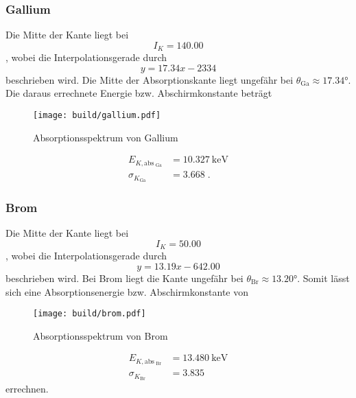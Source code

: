 \subsubsection{Gallium}
Die Mitte der Kante liegt bei 
\begin{equation*}
    I_K = 140.00
\end{equation*}
, wobei die Interpolationsgerade durch 
\begin{equation*}
    y = 17.34x -2334
\end{equation*}
beschrieben wird.
Die Mitte der Absorptionskante liegt ungefähr bei $\theta_\text{Ga} \approx \ang{17.34;;}$. Die daraus errechnete Energie bzw. Abschirmkonstante beträgt
\begin{figure}
    \centering
    \caption{Absorptionsspektrum von Gallium}
    \label{fig:Gallium}
    \texttt{[image: build/gallium.pdf]}
\end{figure}
\begin{align*}
    E_{K, \text{abs}_\text{ Ga}}  &= \SI{10.327}{\kilo\electronvolt} \\
    \sigma_{K_\text{Ga}}                &= \num{3.668} \; \text{.}
\end{align*}
\FloatBarrier
\subsubsection{Brom}
Die Mitte der Kante liegt bei 
\begin{equation*}
    I_K = 50.00
\end{equation*}
, wobei die Interpolationsgerade durch 
\begin{equation*}
    y = 13.19 x -642.00
\end{equation*}
beschrieben wird.
Bei Brom liegt die Kante ungefähr bei $\theta_\text{Br} \approx \ang{13.20;;}$. Somit lässt sich eine Absorptionsenergie bzw. Abschirmkonstante von 
\begin{figure}
    \centering
    \caption{Absorptionsspektrum von Brom}
    \label{fig:Brom}
    \texttt{[image: build/brom.pdf]}
\end{figure}
\begin{align*}
    E_{K, \text{abs}_\text{ Br}}  &= \SI{13.480}{\kilo\electronvolt} \\
    \sigma_{K_\text{Br}}                &= \num{3.835}
\end{align*}
errechnen.
\FloatBarrier
